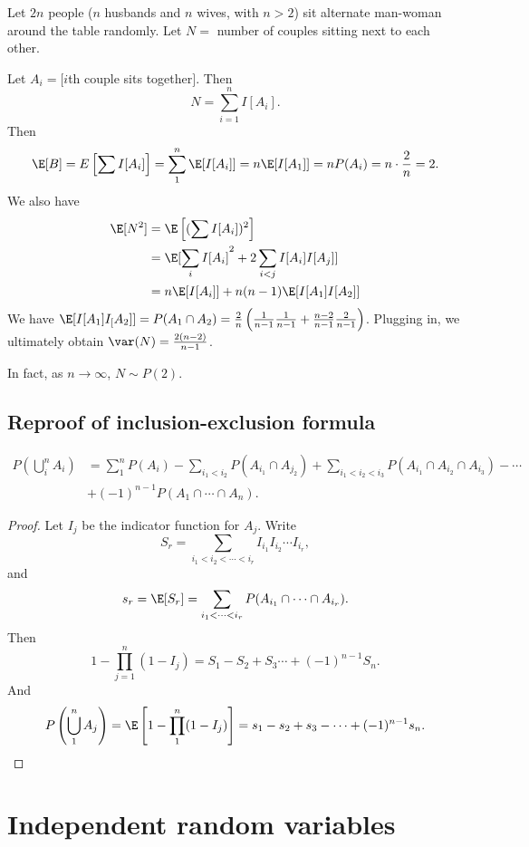\documentclass[a4paper]{article}
\begin{document}
\begin{eg}
  Let $2n$ people ($n$ husbands and $n$ wives, with $n > 2$) sit alternate man-woman around the table randomly. Let $N =$ number of couples sitting next to each other.

  Let $A_i = [i$th couple sits together$]$. Then
  \[
    N = \sum_{i = 1}^n I[A_i].
  \]
  Then 
  \[
    \E[B] = E\left[\sum I[A_i]\right] = \sum_{1}^n \E[I[A_i]] = n\E[I[A_1]] = nP(A_i) = n\cdot \frac{2}{n} = 2.
  \]
  We also have
  \begin{align*}
    \E[N^2] &= \E\left[(\sum I[A_i])^2\right]\\
    &= \E[\sum_i I[A_i]^2 + 2\sum_{i < j}I[A_i]I[A_j]]\\
    &= n\E[I[A_i]] + n(n - 1)\E[I[A_1]I[A_2]]
  \end{align*}
  We have $\E[I[A_1]I_[A_2]] = P(A_1\cap A_2) = \frac{2}{n}\left(\frac{1}{n - 1}\frac{1}{n - 1}  + \frac{n - 2}{n - 1}\frac{2}{n - 1}\right)$. Plugging in, we ultimately obtain $\var(N) = \frac{2(n- 2)}{n - 1}$.

  In fact, as $n\to \infty$, $N\sim P(2)$.
\end{eg}

\subsection{Reproof of inclusion-exclusion formula}
\begin{thm}
  \begin{align*}
    P\left(\bigcup_i^n A_i\right) &= \sum_1^n P(A_i) - \sum_{i_1 < i_2} P(A_{i_1}\cap A_{j_2}) + \sum_{i_1 < i_2 < i_3}P(A_{i_1}\cap A_{i_2} \cap A_{i_3}) - \cdots\\
    &+ (-1)^{n - 1} P(A_1\cap \cdots \cap A_n).
  \end{align*}
\end{thm}

\begin{proof}
  Let $I_j$ be the indicator function for $A_j$. Write
  \[
    S_r = \sum_{i_1 < i_2 < \cdots < i_r}I_{i_1}I_{i_2}\cdots I_{i_r},
  \]
  and
  \[
    s_r = \E[S_r] = \sum_{i_1 < \cdots < i_r}P(A_{i_1}\cap \cdots \cap A_{i_r}).
  \]
  Then
  \[
    1 - \prod_{j = 1}^n(1 - I_j) = S_1 - S_2 + S_3 \cdots + (-1)^{n - 1}S_n.
  \]
  And 
  \[
    P\left(\bigcup_1^n A_j\right) = \E\left[1 - \prod_1^n(1 - I_j)\right] = s_1 - s_2 + s_3 - \cdots + (-1)^{n - 1}s_n.
  \]
\end{proof}
\section{Independent random variables}
\end{document}
